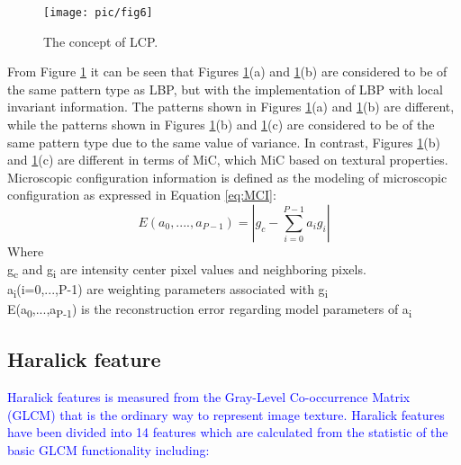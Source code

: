 \documentclass[review]{elsarticle}
\begin{document}
\begin{figure}[h!]
	\centering
	\texttt{[image: pic/fig6]}
	\caption{The concept of LCP.}
	\label{fig:LCP}
\end{figure} 

From Figure \ref{fig:LCP} it can be seen that Figures \ref{fig:LCP}(a) and \ref{fig:LCP}(b) are considered to be of the same pattern type as LBP, but with the implementation of LBP with local invariant information. The patterns shown in Figures \ref{fig:LCP}(a) and \ref{fig:LCP}(b) are different, while the patterns shown in Figures \ref{fig:LCP}(b) and \ref{fig:LCP}(c) are considered to be of the same pattern type due to the same value of variance. In contrast, Figures \ref{fig:LCP}(b) and \ref{fig:LCP}(c) are different in terms of MiC, which MiC based on textural properties. \\

Microscopic configuration information is defined as the modeling of microscopic configuration as expressed in Equation \ref{eq:MCI}: 
\begin{equation}
E(a_0,....,a_{P-1}) = |g_c - \sum_{i=0}^{P-1} a_ig_i|
\label{eq:MCI}
\end{equation}
Where \\
g\textsubscript{c} and g\textsubscript{i} are intensity center pixel values and neighboring pixels.\\
a\textsubscript{i}(i=0,...,P-1) are weighting parameters associated with g\textsubscript{i} \\
E(a\textsubscript{0},...,a\textsubscript{P-1}) is the reconstruction error regarding model parameters of a\textsubscript{i}


 \subsection{Haralick feature}
\label{subsec:haralick}
\textcolor{blue}{
Haralick features is measured from the Gray-Level Co-occurrence Matrix (GLCM) that is the ordinary way to  represent image texture. Haralick features have been divided into 14 features which are calculated from the statistic of the basic GLCM functionality including: }
\end{document}
